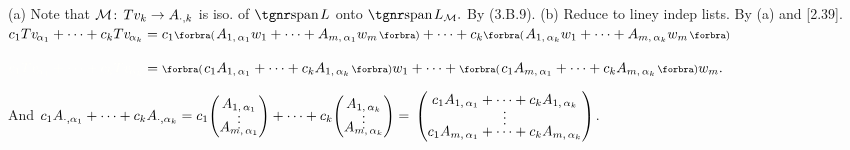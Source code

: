 (a) Note that $\mathcal{M}\!:\,Tv_k\rightarrow A_{\cdot,k}$ is iso. of $\spn L$ onto $\spn L_{\mM}.$ By (3.B.9).\parSol{}
(b) Reduce to liney indep lists. By (a) and [2.39].\PfEnd\vspace{4pt}\quad
\Or\;$c_1Tv_{\:\!\!\alpha_1}+\dots+c_kTv_{\:\!\!\alpha_k}=c_1\BigPar{A_{1,\,{\alpha_1}}w_1+\dots+A_{m,\,{\alpha_1}}w_m}+\dots+c_k\BigPar{A_{1,\,{\alpha_k}}w_1+\dots+A_{m,\,{\alpha_k}}w_m}$\par\vspace{2pt}\quad
\Blind{\Or\;}$\Blind{c_1Tv_{\:\!\!\alpha_1}+\dots+c_kTv_{\:\!\!\alpha_k}}=\BigPar{c_1A_{1,\,{\alpha_1}}+\dots+c_kA_{1,\,{\alpha_k}}}w_1+\dots+\BigPar{c_1A_{m,\,{\alpha_1}}+\dots+c_kA_{m,\,{\alpha_k}}}w_m.$\par\vspace{4pt}\quad
\Blind{\Or\;}And \;$c_1A_{\cdot,{\alpha_1}}+\dots+c_kA_{\cdot,{\alpha_k}}=c_1{\normalsize\begin{pmatrix}A_{1,\,{\alpha_1}}\\[-4pt]\vdots\\[-10pt]A_{m,\,{\alpha_1}}\end{pmatrix}}+\dots+c_k{\normalsize\begin{pmatrix}A_{1,\,{\alpha_k}}\\[-4pt]\vdots\\[-10pt]A_{m,\,{\alpha_k}}\end{pmatrix}}{}={}\normalsize\begin{pmatrix}c_1 A_{1,\,{\alpha_1}}+\dots+c_kA_{1,\,{\alpha_k}}\\[-4pt]\vdots\\[-4pt]c_1A_{m,\,{\alpha_1}}+\dots+c_kA_{m,\,{\alpha_k}}\end{pmatrix}$.\par\vspace{6pt}\quad
